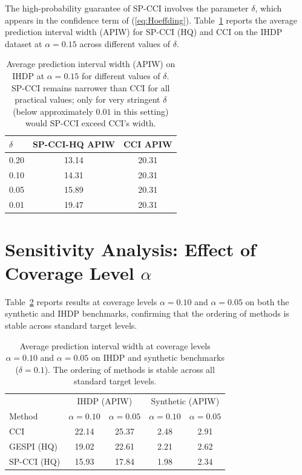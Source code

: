 \documentclass{article}
\theoremstyle{plain}
\theoremstyle{definition}
\theoremstyle{remark}
\begin{document}
The high-probability guarantee of SP-CCI involves the parameter $\delta$, which appears in the confidence term of (\ref{eq:Hoeffding}). Table~\ref{tab:delta_sensitivity} reports the average prediction interval width (APIW) for SP-CCI (HQ) and CCI on the IHDP dataset at $\alpha=0.15$ across different values of $\delta$.

\begin{table}[h!]
\centering
\begin{tabular}{lcc}
\toprule
$\delta$ & SP-CCI-HQ APIW & CCI APIW \\
\midrule
0.20 & 13.14 & 20.31 \\
0.10 & 14.31 & 20.31 \\
0.05 & 15.89 & 20.31 \\
0.01 & 19.47 & 20.31 \\
\bottomrule
\end{tabular}
\caption{Average prediction interval width (APIW) on IHDP at $\alpha=0.15$ for different values of $\delta$. SP-CCI remains narrower than CCI for all practical values; only for very stringent $\delta$ (below approximately $0.01$ in this setting) would SP-CCI exceed CCI's width.}
\label{tab:delta_sensitivity}
\end{table}

\section{Sensitivity Analysis: Effect of Coverage Level $\alpha$}
\label{appendix:alpha_sensitivity}

Table~\ref{tab:alpha_sensitivity} reports results at coverage levels $\alpha=0.10$ and $\alpha=0.05$ on both the synthetic and IHDP benchmarks, confirming that the ordering of methods is stable across standard target levels.

\begin{table}[h!]
\centering
\begin{tabular}{lcccc}
\toprule
& \multicolumn{2}{c}{IHDP (APIW)} & \multicolumn{2}{c}{Synthetic (APIW)} \\
Method & $\alpha=0.10$ & $\alpha=0.05$ & $\alpha=0.10$ & $\alpha=0.05$ \\
\midrule
CCI & 22.14 & 25.37 & 2.48 & 2.91 \\
GESPI (HQ) & 19.02 & 22.61 & 2.21 & 2.62 \\
SP-CCI (HQ) & 15.93 & 17.84 & 1.98 & 2.34 \\
\bottomrule
\end{tabular}
\caption{Average prediction interval width at coverage levels $\alpha=0.10$ and $\alpha=0.05$ on IHDP and synthetic benchmarks ($\delta=0.1$). The ordering of methods is stable across all standard target levels.}
\label{tab:alpha_sensitivity}
\end{table}
\end{document}
